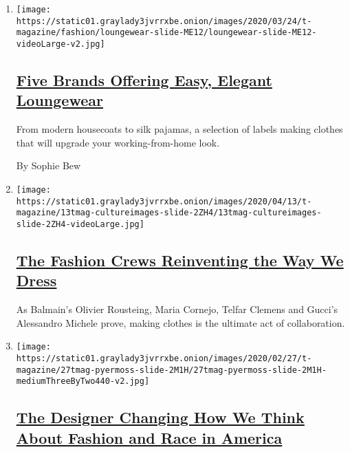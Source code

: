\begin{enumerate}
\def\labelenumi{\arabic{enumi}.}
\item
  \texttt{[image: https://static01.graylady3jvrrxbe.onion/images/2020/03/24/t-magazine/fashion/loungewear-slide-ME12/loungewear-slide-ME12-videoLarge-v2.jpg]}

  \hypertarget{five-brands-offering-easy-elegant-loungewear}{%
  \subsection{\texorpdfstring{\href{/2020/03/26/t-magazine/work-from-home-clothing-lounge-wear.html}{Five
  Brands Offering Easy, Elegant
  Loungewear}}{Five Brands Offering Easy, Elegant Loungewear}}\label{five-brands-offering-easy-elegant-loungewear}}

  From modern housecoats to silk pajamas, a selection of labels making
  clothes that will upgrade your working-from-home look.

  By Sophie Bew
\item
  \texttt{[image: https://static01.graylady3jvrrxbe.onion/images/2020/04/13/t-magazine/13tmag-cultureimages-slide-2ZH4/13tmag-cultureimages-slide-2ZH4-videoLarge.jpg]}

  \hypertarget{the-fashion-crews-reinventing-the-way-we-dress}{%
  \subsection{\texorpdfstring{\href{/interactive/2020/04/13/t-magazine/maria-cornejo-olivier-rousteing-telfar-clemens-alessandro-michele.html}{The
  Fashion Crews Reinventing the Way We
  Dress}}{The Fashion Crews Reinventing the Way We Dress}}\label{the-fashion-crews-reinventing-the-way-we-dress}}

  As Balmain's Olivier Rousteing, Maria Cornejo, Telfar Clemens and
  Gucci's Alessandro Michele prove, making clothes is the ultimate act
  of collaboration.
\item
  \texttt{[image: https://static01.graylady3jvrrxbe.onion/images/2020/02/27/t-magazine/27tmag-pyermoss-slide-2M1H/27tmag-pyermoss-slide-2M1H-mediumThreeByTwo440-v2.jpg]}

  \hypertarget{the-designer-changing-how-we-think-about-fashion-and-race-in-america}{%
  \subsection{\texorpdfstring{\href{/2020/03/05/t-magazine/pyer-moss-kerby-jean-raymond.html}{The
  Designer Changing How We Think About Fashion and Race in
  America}}{The Designer Changing How We Think About Fashion and Race in America}}\label{the-designer-changing-how-we-think-about-fashion-and-race-in-america}}


\end{enumerate}
